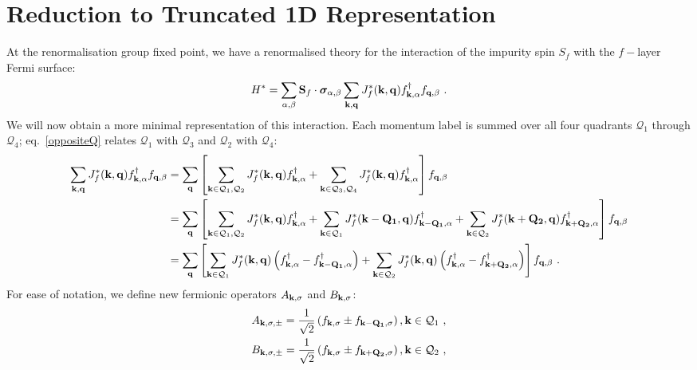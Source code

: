 \documentclass[%
reprint,
superscriptaddress,
groupedaddress,
superscriptaddress,
onecolumn,
10pt
]{revtex4-2}
\begin{document}
\section{Reduction to Truncated 1D Representation}
At the renormalisation group fixed point, we have a renormalised theory for the interaction of the impurity spin \(S_f\) with the \(f-\)layer Fermi surface:
\begin{equation}\begin{aligned}
	H^* = \sum_{\alpha,\beta}{\bf S}_f\cdot{\boldsymbol\sigma}_{\alpha,\beta}\sum_{{\bf k}, {\bf q}} J_f^*({\bf k},{\bf q}) f^\dagger_{{\bf k},\alpha}f_{{\bf q},\beta}~.
\end{aligned}\end{equation}
We will now obtain a more minimal representation of this interaction. Each momentum label is summed over all four quadrants \(\mathcal{Q}_1\) through \(\mathcal{Q}_4\); eq.~\ref{oppositeQ} relates \(\mathcal{Q}_1\) with \(\mathcal{Q}_3\) and \(\mathcal{Q}_2\) with \(\mathcal{Q}_4\):
\begin{equation}\begin{aligned}
	\sum_{{\bf k}, {\bf q}} J_f^*({\bf k},{\bf q}) f^\dagger_{{\bf k},\alpha}f_{{\bf q},\beta} 
	&= \sum_{\bf q}\left[\sum_{{\bf k} \in \mathcal{Q}_1,\mathcal{Q}_2} J_f^*({\bf k},{\bf q}) f^\dagger_{{\bf k},\alpha} + \sum_{{\bf k} \in \mathcal{Q}_3,\mathcal{Q}_4} J_f^*({\bf k},{\bf q}) f^\dagger_{{\bf k},\alpha}\right] f_{{\bf q},\beta}\\
	&= \sum_{\bf q}\left[\sum_{{\bf k} \in \mathcal{Q}_1,\mathcal{Q}_2} J_f^*({\bf k},{\bf q}) f^\dagger_{{\bf k},\alpha} + \sum_{{\bf k} \in \mathcal{Q}_1} J_f^*({\bf k - Q_1},{\bf q}) f^\dagger_{{\bf k - Q_1},\alpha} + \sum_{{\bf k} \in \mathcal{Q}_2} J_f^*({\bf k + Q_2},{\bf q}) f^\dagger_{{\bf k + Q_2},\alpha}\right] f_{{\bf q},\beta}\\
	&= \sum_{\bf q}\left[\sum_{{\bf k} \in \mathcal{Q}_1} J_f^*({\bf k},{\bf q}) \left(f^\dagger_{{\bf k},\alpha} - f^\dagger_{{\bf k - Q_1},\alpha}\right) + \sum_{{\bf k} \in \mathcal{Q}_2} J_f^*({\bf k},{\bf q}) \left(f^\dagger_{{\bf k},\alpha} - f^\dagger_{{\bf k + Q_2},\alpha}\right) \right] f_{{\bf q},\beta}~.
\end{aligned}\end{equation}
For ease of notation, we define new fermionic operators \(A_{{\bf k},\sigma}\) and \(B_{{\bf k},\sigma}\):
\begin{equation}\begin{aligned}\label{defineA}
	A_{{\bf k},\sigma,\pm} = \frac{1}{\sqrt{2}}\left(f_{{\bf k},\sigma} \pm f_{{\bf k - Q_1},\sigma}\right), {\bf k}\in\mathcal{Q}_1~,\\
	B_{{\bf k},\sigma,\pm} = \frac{1}{\sqrt{2}}\left(f_{{\bf k},\sigma} \pm f_{{\bf k + Q_2},\sigma}\right), {\bf k}\in\mathcal{Q}_2~,
\end{aligned}\end{equation}
\end{document}
